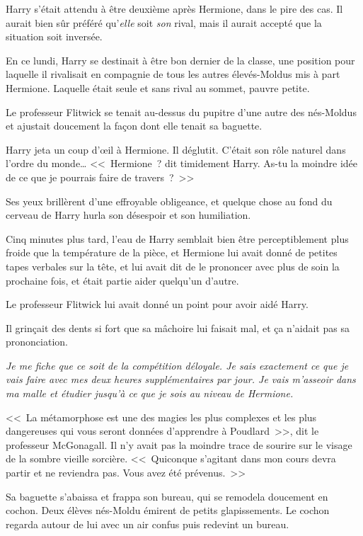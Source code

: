 Harry s'était attendu à être deuxième après Hermione, dans le pire des cas. Il aurait bien sûr préféré qu'\emph{elle} soit \emph{son} rival, mais il aurait accepté que la situation soit inversée.

En ce lundi, Harry se destinait à être bon dernier de la classe, une position pour laquelle il rivalisait en compagnie de tous les autres élevés-Moldus mis à part Hermione. Laquelle était seule et sans rival au sommet, pauvre petite.

Le professeur Flitwick se tenait au-dessus du pupitre d'une autre des nés-Moldus et ajustait doucement la façon dont elle tenait sa baguette.

Harry jeta un coup d'œil à Hermione. Il déglutit. C'était son rôle naturel dans l'ordre du monde… <<~Hermione~? dit timidement Harry. As-tu la moindre idée de ce que je pourrais faire de travers~?~>>

Ses yeux brillèrent d'une effroyable obligeance, et quelque chose au fond du cerveau de Harry hurla son désespoir et son humiliation.

Cinq minutes plus tard, l'eau de Harry semblait bien être perceptiblement plus froide que la température de la pièce, et Hermione lui avait donné de petites tapes verbales sur la tête, et lui avait dit de le prononcer avec plus de soin la prochaine fois, et était partie aider quelqu'un d'autre.

Le professeur Flitwick lui avait donné un point pour avoir aidé Harry.

Il grinçait des dents si fort que sa mâchoire lui faisait mal, et ça n'aidait pas sa prononciation.

\emph{Je me fiche que ce soit de la compétition déloyale. Je sais exactement ce que je vais faire avec mes deux heures supplémentaires par jour. Je vais m'asseoir dans ma malle et étudier jusqu'à ce que je sois au niveau de Hermione.}

\later

<<~La métamorphose est une des magies les plus complexes et les plus dangereuses qui vous seront données d'apprendre à Poudlard~>>, dit le professeur McGonagall. Il n'y avait pas la moindre trace de sourire sur le visage de la sombre vieille sorcière. <<~Quiconque s'agitant dans mon cours devra partir et ne reviendra pas. Vous avez été prévenus.~>>

Sa baguette s'abaissa et frappa son bureau, qui se remodela doucement en cochon. Deux élèves nés-Moldu émirent de petits glapissements. Le cochon regarda autour de lui avec un air confus puis redevint un bureau.

